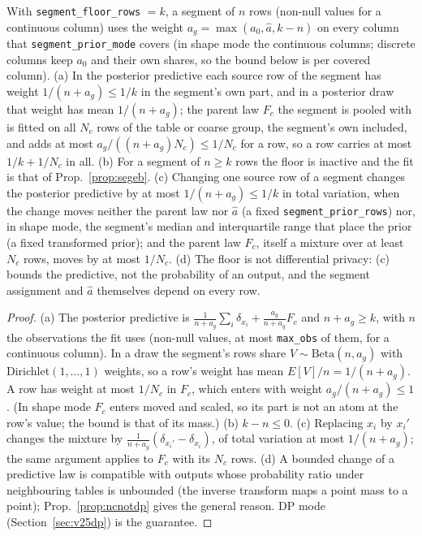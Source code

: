 \setcounter{proposition}{1725}
\begin{proposition}\label{prop:segfloor}
With \texttt{segment\_floor\_rows} $=k$, a segment of $n$ rows (non-null values for a continuous column) uses the weight $a_g=\max(a_0,\hat a,k-n)$ on every column that \texttt{segment\_prior\_mode} covers (in shape mode the continuous columns; discrete columns keep $a_0$ and their own shares, so the bound below is per covered column). (a) In the posterior predictive each source row of the segment has weight $1/(n+a_g)\le1/k$ in the segment's own part, and in a posterior draw that weight has mean $1/(n+a_g)$; the parent law $F_c$ the segment is pooled with is fitted on all $N_c$ rows of the table or coarse group, the segment's own included, and adds at most $a_g/((n+a_g)N_c)\le1/N_c$ for a row, so a row carries at most $1/k+1/N_c$ in all. (b) For a segment of $n\ge k$ rows the floor is inactive and the fit is that of Prop.~\ref{prop:segeb}. (c) Changing one source row of a segment changes the posterior predictive by at most $1/(n+a_g)\le 1/k$ in total variation, when the change moves neither the parent law nor $\hat a$ (a fixed \texttt{segment\_prior\_rows}) nor, in shape mode, the segment's median and interquartile range that place the prior (a fixed transformed prior); and the parent law $F_c$, itself a mixture over at least $N_c$ rows, moves by at most $1/N_c$. (d) The floor is not differential privacy: (c) bounds the predictive, not the probability of an output, and the segment assignment and $\hat a$ themselves depend on every row.
\end{proposition}
\begin{proof}
(a) The posterior predictive is $\frac{1}{n+a_g}\sum_{i}\delta_{x_i}+\frac{a_g}{n+a_g}F_c$ and $n+a_g\ge k$, with $n$ the observations the fit uses (non-null values, at most \texttt{max\_obs} of them, for a continuous column). In a draw the segment's rows share $V\sim\mathrm{Beta}(n,a_g)$ with Dirichlet$(1,\dots,1)$ weights, so a row's weight has mean $E[V]/n=1/(n+a_g)$. A row has weight at most $1/N_c$ in $F_c$, which enters with weight $a_g/(n+a_g)\le1$. (In shape mode $F_c$ enters moved and scaled, so its part is not an atom at the row's value; the bound is that of its mass.) (b) $k-n\le0$. (c) Replacing $x_i$ by $x_i'$ changes the mixture by $\frac{1}{n+a_g}(\delta_{x_i'}-\delta_{x_i})$, of total variation at most $1/(n+a_g)$; the same argument applies to $F_c$ with its $N_c$ rows. (d) A bounded change of a predictive law is compatible with outputs whose probability ratio under neighbouring tables is unbounded (the inverse transform maps a point mass to a point); Prop.~\ref{prop:ncnotdp} gives the general reason. DP mode (Section~\ref{sec:v25dp}) is the guarantee.
\end{proof}
